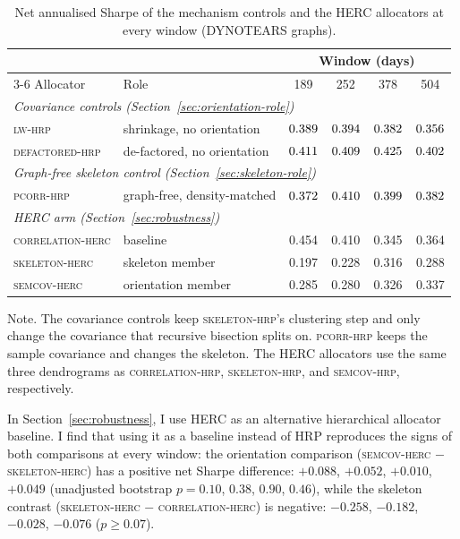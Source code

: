 \documentclass[11pt, a4paper]{report}
\newcommand{\corrhrp}{\textsc{correlation-hrp}}
\newcommand{\skelhrp}{\textsc{skeleton-hrp}}
\newcommand{\semcovhrp}{\textsc{semcov-hrp}}
\newcommand{\lwhrp}{\textsc{lw-hrp}}
\newcommand{\dfhrp}{\textsc{defactored-hrp}}
\newcommand{\pcorrhrp}{\textsc{pcorr-hrp}}
\newcommand{\corrherc}{\textsc{correlation-herc}}
\newcommand{\skelherc}{\textsc{skeleton-herc}}
\newcommand{\semcovherc}{\textsc{semcov-herc}}
\newcommand{\floatnote}[1]{\par\vspace{3pt}\begin{minipage}{0.92\textwidth}\footnotesize Note. #1\end{minipage}\par}
\begin{document}
\begin{table}[htbp]
  \centering
  \caption{Net annualised Sharpe of the mechanism controls and the HERC allocators at every window (DYNOTEARS graphs).}
  \label{tab:controls-full}
  \begin{tabular}{l l c c c c}
    \toprule
    & & \multicolumn{4}{c}{Window (days)} \\
    \cmidrule(lr){3-6}
    Allocator & Role & 189 & 252 & 378 & 504 \\
    \midrule
    \multicolumn{6}{l}{\emph{Covariance controls (Section~\ref{sec:orientation-role})}} \\
    \lwhrp{}     & shrinkage, no orientation   & $0.389$ & $0.394$ & $0.382$ & $0.356$ \\
    \dfhrp{}     & de-factored, no orientation & $0.411$ & $0.409$ & $0.425$ & $0.402$ \\
    \midrule
    \multicolumn{6}{l}{\emph{Graph-free skeleton control (Section~\ref{sec:skeleton-role})}} \\
    \pcorrhrp{}  & graph-free, density-matched & $0.372$ & $0.410$ & $0.399$ & $0.382$ \\
    \midrule
    \multicolumn{6}{l}{\emph{HERC arm (Section~\ref{sec:robustness})}} \\
    \corrherc{}   & baseline           & 0.454 & 0.410 & 0.345 & 0.364 \\
    \skelherc{}   & skeleton member    & 0.197 & 0.228 & 0.316 & 0.288 \\
    \semcovherc{} & orientation member & 0.285 & 0.280 & 0.326 & 0.337 \\
    \bottomrule
  \end{tabular}
  \floatnote{The covariance controls keep \skelhrp{}'s clustering step and only change the covariance that recursive bisection splits on. \pcorrhrp{} keeps the sample covariance and changes the skeleton. The HERC allocators use the same three dendrograms as \corrhrp{}, \skelhrp{}, and \semcovhrp{}, respectively.}
\end{table}

In Section~\ref{sec:robustness}, I use HERC as an alternative hierarchical allocator baseline. I find that using it as a baseline instead of HRP reproduces the signs of both comparisons at every window: the orientation comparison
(\semcovherc{} $-$ \skelherc{}) has a positive net Sharpe difference: $+0.088$,
$+0.052$, $+0.010$, $+0.049$ (unadjusted bootstrap $p=0.10$, $0.38$,
$0.90$, $0.46$), while the skeleton contrast (\skelherc{} $-$ \corrherc{}) is
negative: $-0.258$, $-0.182$, $-0.028$, $-0.076$ ($p \geq
0.07$).
\end{document}

